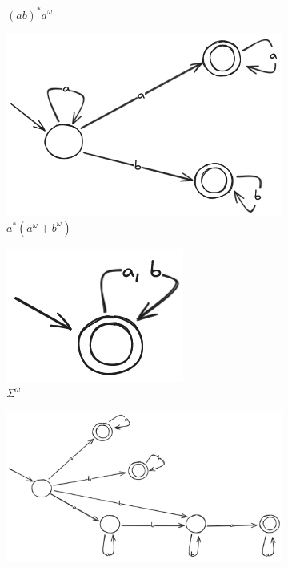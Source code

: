 \documentclass{article}
\begin{document}
\begin{figure}[!htb]
\begin{subfigure}[b]{0.2\textwidth}
		\caption{$(ab)^*a^\omega$}
	\end{subfigure}
	\hfil
	\begin{subfigure}[b]{0.3\textwidth}
		\centering
		\includegraphics[width=\textwidth]{04-10-07.png}
		\caption{$a^*(a^\omega + b^\omega)$}
	\end{subfigure}
	\hfil
	\begin{subfigure}[b]{0.1\textwidth}
		\centering
		\includegraphics[width=\textwidth]{04-10-08.png}
		\caption{$\Sigma^\omega$}
	\end{subfigure}
	\hfil
	\begin{subfigure}[b]{0.5\textwidth}
		\centering
		\includegraphics[width=\textwidth]{04-10-09.png}

\end{subfigure}
\end{figure}
\end{document}

